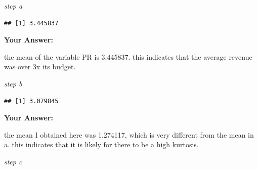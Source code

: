 \documentclass[
]{article}
\newenvironment{Shaded}{\begin{snugshade}}{\end{snugshade}}
\newcommand{\ControlFlowTok}[1]{\textcolor[rgb]{0.13,0.29,0.53}{\textbf{#1}}}
\newcommand{\DecValTok}[1]{\textcolor[rgb]{0.00,0.00,0.81}{#1}}
\newcommand{\FunctionTok}[1]{\textcolor[rgb]{0.13,0.29,0.53}{\textbf{#1}}}
\newcommand{\NormalTok}[1]{#1}
\newcommand{\OtherTok}[1]{\textcolor[rgb]{0.56,0.35,0.01}{#1}}
\newcommand{\SpecialCharTok}[1]{\textcolor[rgb]{0.81,0.36,0.00}{\textbf{#1}}}
\begin{document}
\emph{step a}

\begin{Shaded}
\end{Shaded}

\begin{verbatim}
## [1] 3.445837
\end{verbatim}

\textbf{Your Answer:}

the mean of the variable PR is 3.445837. this indicates that the average
revenue was over 3x its budget.

\emph{step b}

\begin{Shaded}
\end{Shaded}

\begin{verbatim}
## [1] 3.079845
\end{verbatim}

\textbf{Your Answer:}

the mean I obtained here was 1.274117, which is very different from the
mean in a. this indicates that it is likely for there to be a high
kurtosis.

\emph{step c}

\begin{Shaded}
\end{Shaded}
\end{document}
